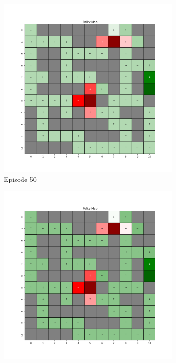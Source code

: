 \documentclass{assignment}
\begin{document}
\begin{figure}[H]
\begin{subfigure}{0.3\textwidth}
        \includegraphics[width=\textwidth]{figures/policy_td/gamma_sweep/policy_alpha_0.1_gamma_0.1_epsilon_0.2_iteration_50.png}
    \caption{Episode 50}
    \end{subfigure}\hfill
    \begin{subfigure}{0.3\textwidth}
        \includegraphics[width=\textwidth]{figures/policy_td/gamma_sweep/policy_alpha_0.1_gamma_0.1_epsilon_0.2_iteration_100.png}

\end{subfigure}
\end{figure}
\end{document}
